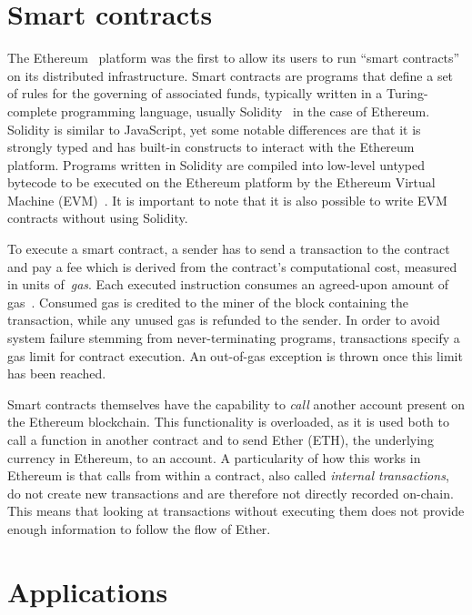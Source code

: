\section{Smart contracts}
The Ethereum~\cite{buterin2014} platform was the first to allow its users to run ``smart contracts'' on its distributed infrastructure.
Smart contracts are programs that define a set of rules for the governing of associated funds, typically written in a Turing-complete programming language, usually Solidity~\cite{dannen:2017:ies:3103305} in the case of Ethereum.
Solidity is similar to JavaScript, yet some notable differences are that it is strongly typed and has built-in constructs to interact with the Ethereum platform.
Programs written in Solidity are compiled into low-level untyped bytecode to be executed on the Ethereum platform by the Ethereum Virtual Machine (EVM)~\cite{wood2014ethereum}.
It is important to note that it is also possible to write EVM contracts without using Solidity.

To execute a smart contract, a sender has to send a transaction to the contract and pay a fee which is derived from the contract's computational cost, measured in units of~\emph{gas}. Each executed instruction consumes an agreed-upon amount of gas~\cite{wood2014ethereum}. Consumed gas is credited to the miner of the block containing the transaction, while any unused gas is refunded to the sender. In order to avoid system failure stemming from never-terminating programs, transactions specify a gas limit for contract execution. An out-of-gas exception is thrown once this limit has been reached.

Smart contracts themselves have the capability to \emph{call} another account present on the Ethereum blockchain. This functionality is overloaded, as it is used both to call a function in another contract and to send Ether (ETH), the underlying currency in Ethereum, to an account. A particularity of how this works in Ethereum is that calls from within a contract, also called \emph{internal transactions}, do not create new transactions and are therefore not directly recorded on-chain. This means that looking at transactions without executing them does not provide enough information to follow the flow of Ether.


\section{Applications}

